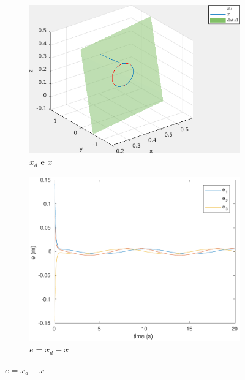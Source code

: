 \documentclass[a4paper,11pt]{article}
\theoremstyle{mytheor}
\begin{document}
\begin{figure}[!ht]
\centering
  \begin{minipage}{\linewidth}
  \centering
    \begin{subfigure}[b]{1\textwidth}
    \includegraphics[width=1\textwidth]{figs/ex1_c_2_x.png}
    \caption{$x_d$ e $x$}
    \label{fig:ex1_c_2_x}
    \end{subfigure}
  \end{minipage}
  \begin{minipage}{\linewidth}
  \centering
    \begin{subfigure}[b]{0.45\textwidth}
    \includegraphics[width=1\textwidth]{figs/ex1_c_2_e.pdf}
    \caption{$e = x_d - x$}
    \label{fig:ex1_c_2_e}
    \end{subfigure}

\end{minipage}
\end{figure}
\end{document}
